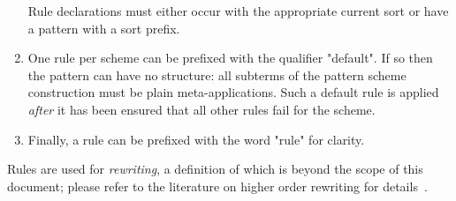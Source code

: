 \documentclass[11pt]{article} %
\begin{document}
\begin{manual}
\begin{enumerate}
    Rule declarations must either occur with the appropriate current sort or have a pattern with a
    sort prefix.

  \item One rule per scheme can be prefixed with the qualifier "default". If so then the pattern can
    have no structure: all subterms of the pattern scheme construction must be plain
    meta-applications. Such a default rule is applied \emph{after} it has been ensured that all
    other rules fail for the scheme.

  \item Finally, a rule can be prefixed with the word "rule" for clarity.

  \end{enumerate}
  Rules are used for \emph{rewriting}, a definition of which is beyond the scope of this document;
  please refer to the literature on higher order rewriting for details~\cite{Jouannaud:klop2005,Klop+:tcs1993}.
\end{manual}
\end{document}
